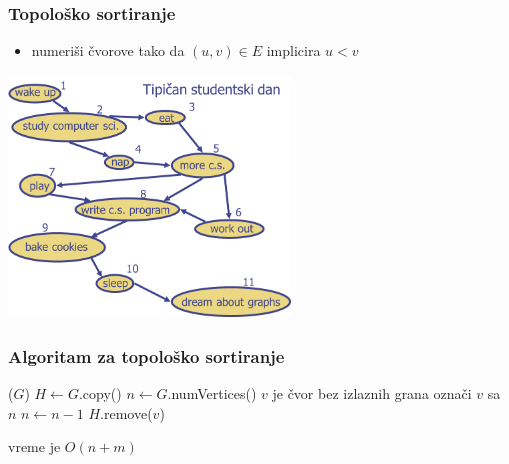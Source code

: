 \documentclass[compress]{beamer}
\renewcommand{\algorithmiccomment}[1]{\hfill \{\myred{#1}\}}
\begin{document}
\begin{frame}[fragile]
  \frametitle{Topološko sortiranje}
  \begin{itemize}
    \item numeriši čvorove tako da $(u,v) \in E$ implicira $u<v$ 
  \end{itemize}
  \begin{center}
    \includegraphics[width=7.5cm]{asp-14-pic47.png}
  \end{center}
\end{frame}

\begin{frame}[fragile]
  \frametitle{Algoritam za topološko sortiranje}
  \begin{algorithmic}
    \STATE {}($G$)
    \STATE $H \leftarrow G$.copy()
    \STATE $n \leftarrow G$.numVertices()
      \STATE $v$ je čvor bez izlaznih grana
      \STATE označi $v$ sa $n$
      \STATE $n \leftarrow n-1$
      \STATE $H$.remove($v$)
    \ENDWHILE
  \end{algorithmic}
  \hfill vreme je $O(n+m)$
\end{frame}

\renewcommand{\algorithmiccomment}[1]{\{\myred{#1}\}}
\end{document}
